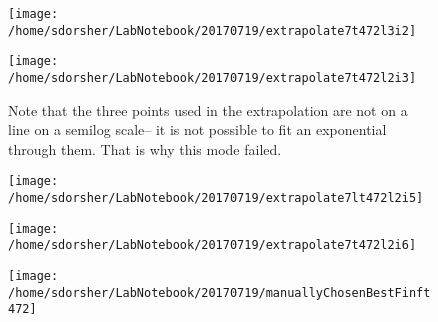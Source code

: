\documentclass{article}
\begin{document}
\begin{figure}
  \texttt{[image: /home/sdorsher/LabNotebook/20170719/extrapolate7t472l3i2]}
\end{figure}

\begin{figure}
  \texttt{[image: /home/sdorsher/LabNotebook/20170719/extrapolate7t472l2i3]}
  \caption{Note that the three points used in the extrapolation are not on a line on a semilog scale-- it is not possible to fit an exponential through them. That is why this mode failed.}
\end{figure}

\begin{figure}
  \texttt{[image: /home/sdorsher/LabNotebook/20170719/extrapolate7lt472l2i5]}
\end{figure}

\begin{figure}
  \texttt{[image: /home/sdorsher/LabNotebook/20170719/extrapolate7t472l2i6]}
\end{figure}

\begin{figure}
  \texttt{[image: /home/sdorsher/LabNotebook/20170719/manuallyChosenBestFinft472]}
\end{figure}
\end{document}
